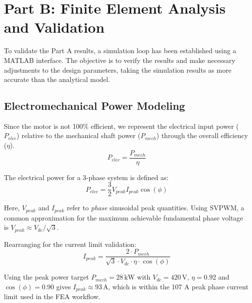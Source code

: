 \documentclass[11pt,a4paper]{article}
\begin{document}
\section{Part B: Finite Element Analysis and Validation}
\label{sec:part_b_fea}
To validate the Part A results, a simulation loop has been established using a MATLAB interface. The objective is to verify the results and make necessary adjustments to the design parameters, taking the simulation results as more accurate than the analytical model.

\subsection{Electromechanical Power Modeling}
Since the motor is not 100\% efficient, we represent the electrical input power ($P_{elec}$) relative to the mechanical shaft power ($P_{mech}$) through the overall efficiency ($\eta$).
\begin{equation}
    P_{elec} = \frac{P_{mech}}{\eta}
\end{equation}

The electrical power for a 3-phase system is defined as:
\begin{equation}
    P_{elec} = \frac{3}{2} V_{peak} I_{peak} \cos(\phi)
\end{equation}

Here, $V_{peak}$ and $I_{peak}$ refer to \emph{phase} sinusoidal peak quantities. Using SVPWM, a common approximation for the maximum achievable fundamental phase voltage is $V_{peak}\approx V_{dc}/\sqrt{3}$.

Rearranging for the current limit validation:
\begin{equation}
    I_{peak} = \frac{2 \cdot P_{mech}}{\sqrt{3} \cdot V_{dc} \cdot \eta \cdot \cos(\phi)}
\end{equation}

Using the peak power target $P_{mech}=28\,\text{kW}$ with $V_{dc}=420\,\text{V}$, $\eta=0.92$ and $\cos(\phi)=0.90$ gives $I_{peak}\approx 93\,\text{A}$, which is within the 107 A peak phase current limit used in the FEA workflow.
\end{document}
